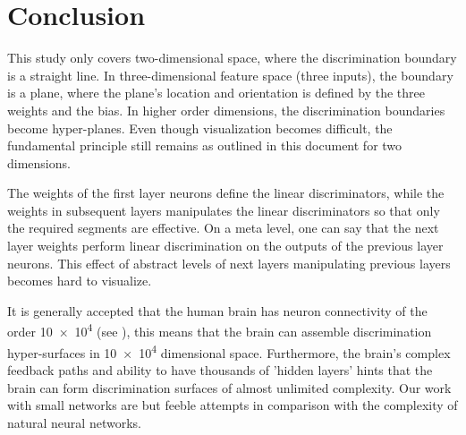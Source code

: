 \section{Conclusion}

This study only covers two-dimensional space, where the discrimination boundary is a straight line.  In three-dimensional feature space (three inputs), the boundary is a plane, where the plane's location and orientation is defined by the three weights and the bias.  In higher order dimensions, the discrimination boundaries become hyper-planes.  Even though visualization becomes difficult, the fundamental principle still remains as outlined in this document for two dimensions.

The weights of the first layer neurons define the linear discriminators, while the weights in subsequent layers manipulates the linear discriminators so that only the required segments are effective.  On a meta level, one can say that the next layer weights perform linear discrimination on the outputs of the previous layer neurons.  This effect of abstract levels of next layers manipulating previous layers becomes hard to visualize.

It is generally accepted that the human brain has neuron connectivity of the order \num{10e4} (see \cite{WikiPediaNeuron2019}), this means that the brain can assemble discrimination hyper-surfaces in \num{10e4}  dimensional space.  Furthermore, the brain's complex feedback paths and ability to have thousands of 'hidden layers' hints that the brain can form discrimination surfaces of almost unlimited complexity.  Our work with small networks are but feeble attempts in comparison with the complexity of natural neural networks.  


